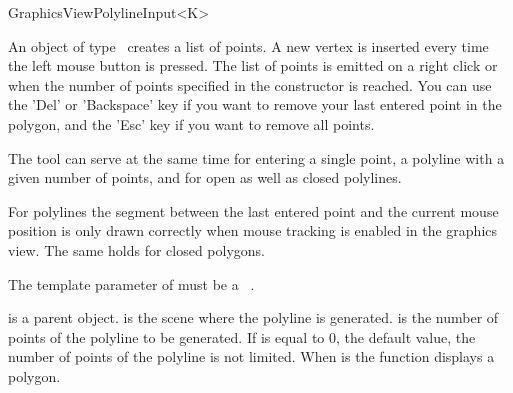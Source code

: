 \begin{ccRefClass}[Qt::]{GraphicsViewPolylineInput<K>}

\ccDefinition
An object of type \ccRefName\ creates a list of points. A new 
vertex is inserted every time the left mouse button is pressed.
The list of points is emitted on a right click or when the number of
points specified in the constructor is reached. You can use the 'Del'
or 'Backspace' key if you want to remove your last entered point in the polygon,
and the 'Esc' key if you want to remove all points.

The tool can serve at the same time for entering a single point,
a polyline with a given number of points, and for open as well as closed
polylines.

For polylines the segment between the last entered point and the current
mouse position is only drawn correctly when mouse tracking is enabled
in the graphics view. The same holds for closed polygons.


\ccParameters

The template parameter of  must be a \cgal\ . 

\ccInheritsFrom
{}

\ccGlue

\ccCreation
{}

{ is a parent object.  is the scene where the polyline is generated.  is the
  number of points of the polyline to be generated. If  is equal to 0,
  the default value, the number of points of the polyline is not
  limited. When  is  the function displays a
  polygon.}



\end{ccRefClass}







